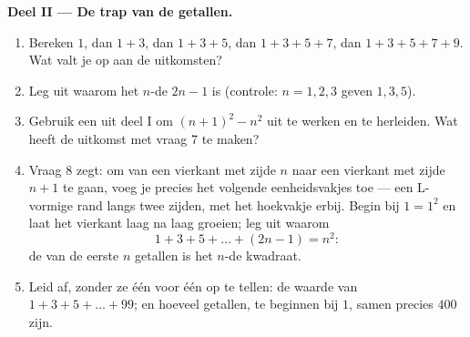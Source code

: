 \begin{problem}[{Weekendopgave --- $(a+b)^2$, $(a-b)^2$,
$(a+b)(a-b)$, en de som $1 + 3 + 5 + \dots + (2n-1) = n^2$}]
\medskip
\noindent\textbf{Deel II --- De trap van de  getallen.}
\begin{enumerate}[resume]
  \item Bereken $1$, dan $1 + 3$, dan $1 + 3 + 5$, dan
        $1 + 3 + 5 + 7$, dan $1 + 3 + 5 + 7 + 9$. Wat valt je op aan de
        uitkomsten?
  \item Leg uit waarom het $n$-de  $2n - 1$ is (controle:
        $n = 1, 2, 3$ geven $1, 3, 5$).
  \item Gebruik een  uit deel I om $(n + 1)^2 - n^2$ uit te werken en te
        herleiden. Wat heeft de uitkomst met vraag 7 te maken?
  \item Vraag 8 zegt: om van een vierkant met zijde $n$ naar een vierkant met
        zijde $n + 1$ te gaan, voeg je precies het volgende 
        eenheidsvakjes toe --- een L-vormige rand langs twee zijden, met het
        hoekvakje erbij. Begin bij $1 = 1^2$ en laat het vierkant laag na laag
        groeien; leg uit waarom
        \[
        1 + 3 + 5 + \dots + (2n - 1) = n^2 :
        \]
        de  van de eerste $n$  getallen is het $n$-de kwadraat.
  \item Leid af, zonder ze één voor één op te tellen: de waarde van
        $1 + 3 + 5 + \dots + 99$; en hoeveel  getallen, te beginnen bij
        $1$, samen precies $400$ zijn.
\end{enumerate}


\end{problem}
